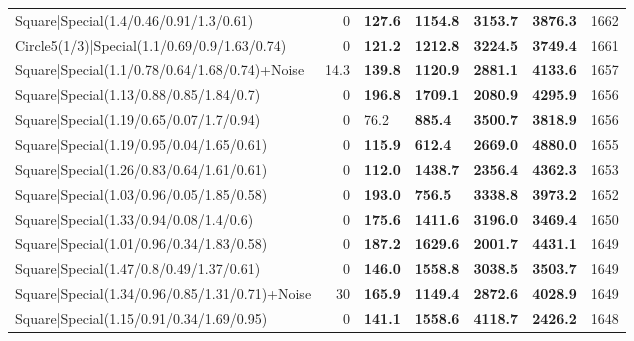 \begin{tabular}{lrllllr}
 Square|Special(1.4/0.46/0.91/1.3/0.61)                        &             0   & \textbf{127.6} & \textbf{1154.8} & \textbf{3153.7} & \textbf{3876.3} &         1662 \\
 Circle5(1/3)|Special(1.1/0.69/0.9/1.63/0.74)                  &             0   & \textbf{121.2} & \textbf{1212.8} & \textbf{3224.5} & \textbf{3749.4} &         1661 \\
 Square|Special(1.1/0.78/0.64/1.68/0.74)+Noise                 &            14.3 & \textbf{139.8} & \textbf{1120.9} & \textbf{2881.1} & \textbf{4133.6} &         1657 \\
 Square|Special(1.13/0.88/0.85/1.84/0.7)                       &             0   & \textbf{196.8} & \textbf{1709.1} & \textbf{2080.9} & \textbf{4295.9} &         1656 \\
 Square|Special(1.19/0.65/0.07/1.7/0.94)                       &             0   & 76.2           & \textbf{885.4}  & \textbf{3500.7} & \textbf{3818.9} &         1656 \\
 Square|Special(1.19/0.95/0.04/1.65/0.61)                      &             0   & \textbf{115.9} & \textbf{612.4}  & \textbf{2669.0} & \textbf{4880.0} &         1655 \\
 Square|Special(1.26/0.83/0.64/1.61/0.61)                      &             0   & \textbf{112.0} & \textbf{1438.7} & \textbf{2356.4} & \textbf{4362.3} &         1653 \\
 Square|Special(1.03/0.96/0.05/1.85/0.58)                      &             0   & \textbf{193.0} & \textbf{756.5}  & \textbf{3338.8} & \textbf{3973.2} &         1652 \\
 Square|Special(1.33/0.94/0.08/1.4/0.6)                        &             0   & \textbf{175.6} & \textbf{1411.6} & \textbf{3196.0} & \textbf{3469.4} &         1650 \\
 Square|Special(1.01/0.96/0.34/1.83/0.58)                      &             0   & \textbf{187.2} & \textbf{1629.6} & \textbf{2001.7} & \textbf{4431.1} &         1649 \\
 Square|Special(1.47/0.8/0.49/1.37/0.61)                       &             0   & \textbf{146.0} & \textbf{1558.8} & \textbf{3038.5} & \textbf{3503.7} &         1649 \\
 Square|Special(1.34/0.96/0.85/1.31/0.71)+Noise                &            30   & \textbf{165.9} & \textbf{1149.4} & \textbf{2872.6} & \textbf{4028.9} &         1649 \\
 Square|Special(1.15/0.91/0.34/1.69/0.95)                      &             0   & \textbf{141.1} & \textbf{1558.6} & \textbf{4118.7} & \textbf{2426.2} &         1648 \\

\end{tabular}
